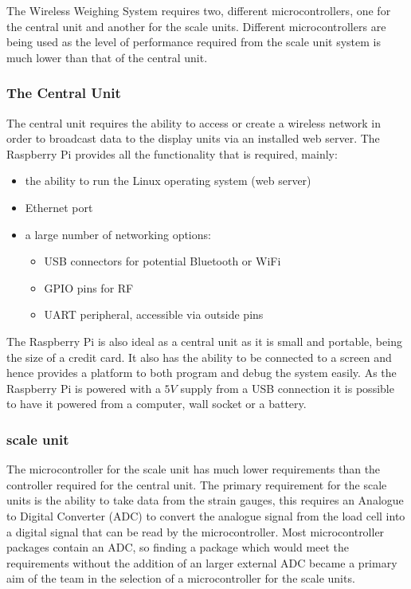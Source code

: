 The Wireless Weighing System requires two, different microcontrollers, one for the central unit and another for the scale units. Different microcontrollers are being used as the level of performance required from the scale unit system is much lower than that of the central unit.

\subsubsection{The Central Unit}
The central unit requires the ability to access or create a wireless network in order to broadcast data to the display units via an installed web server. The Raspberry Pi \cite{raspberrypi} provides all the functionality that is required, mainly:
	\begin{itemize}
		\item the ability to run the Linux operating system (web server)
		\item Ethernet port
		\item a large number of networking options:
			\begin{itemize} 
				\item USB connectors for potential Bluetooth or WiFi
				\item GPIO pins for RF
				\item UART peripheral, accessible via outside pins
			\end{itemize}
	\end{itemize}
The Raspberry Pi is also ideal as a central unit as it is small and portable, being the size of a credit card. It also has the ability to be connected to a screen and hence provides a platform to both program and debug the system easily. As the Raspberry Pi is powered with a $5\unit{V}$ supply from a USB connection it is possible to have it powered from a computer, wall socket or a battery.

\subsubsection{scale unit}
The microcontroller for the scale unit has much lower requirements than the controller required for the central unit. The primary requirement for the scale units is the ability to take data from the strain gauges, this requires an Analogue to Digital Converter (ADC) to convert the analogue signal from the load cell into a digital signal that can be read by the microcontroller. Most microcontroller packages contain an ADC, so finding a package which would meet the requirements without the addition of an larger external ADC became a primary aim of the team in the selection of a microcontroller for the scale units. 


